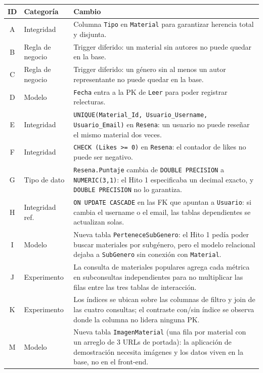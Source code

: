 \documentclass[12pt,a4paper]{article}
\begin{document}
\begin{center}
\begin{longtable}{clp{8.5cm}}
\toprule
\textbf{ID} & \textbf{Categoría} & \textbf{Cambio} \\
\midrule
\endhead
A & Integridad & Columna \texttt{Tipo} en \texttt{Material} para garantizar
    herencia total y disjunta. \\
B & Regla de negocio & Trigger diferido: un material sin autores no puede
    quedar en la base. \\
C & Regla de negocio & Trigger diferido: un género sin al menos un autor
    representante no puede quedar en la base. \\
D & Modelo & \texttt{Fecha} entra a la PK de \texttt{Leer} para poder
    registrar relecturas. \\
E & Integridad & \texttt{UNIQUE(Material\_Id, Usuario\_Username,
    Usuario\_Email)} en \texttt{Resena}: un usuario no puede reseñar el
    mismo material dos veces. \\
F & Integridad & \texttt{CHECK (Likes >= 0)} en \texttt{Resena}: el contador
    de likes no puede ser negativo. \\
G & Tipo de dato & \texttt{Resena.Puntaje} cambia de \texttt{DOUBLE PRECISION}
    a \texttt{NUMERIC(3,1)}: el Hito 1 especificaba un decimal exacto, y
    \texttt{DOUBLE PRECISION} no lo garantiza. \\
H & Integridad ref. & \texttt{ON UPDATE CASCADE} en las FK que apuntan a
    \texttt{Usuario}: si cambia el username o el email, las tablas dependientes
    se actualizan solas. \\
I & Modelo & Nueva tabla \texttt{PerteneceSubGenero}: el Hito 1 pedía poder
    buscar materiales por subgénero, pero el modelo relacional dejaba a
    \texttt{SubGenero} sin conexión con \texttt{Material}. \\
J & Experimento & La consulta de materiales populares agrega cada métrica en
    subconsultas independientes para no multiplicar las filas entre las tres
    tablas de interacción. \\
K & Experimento & Los índices se ubican sobre las columnas de filtro y join de
    las cuatro consultas; el contraste con/sin índice se observa donde la
    columna no lidera ninguna PK. \\
M & Modelo & Nueva tabla \texttt{ImagenMaterial} (una fila por material con un
    arreglo de 3 URLs de portada): la aplicación de demostración necesita
    imágenes y los datos viven en la base, no en el front-end. \\
\bottomrule
\end{longtable}
\end{center}
\end{document}
